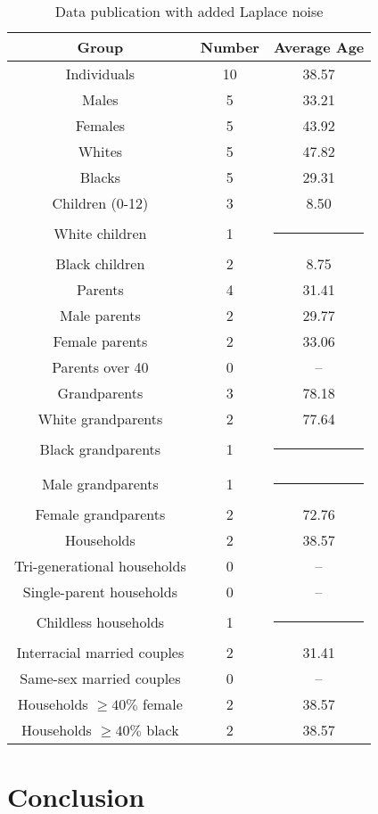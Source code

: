 \documentclass[runningheads]{llncs}
\begin{document}
\begin{table}[t]
\begin{tabular}{c|c|c}
Group & Number & Average Age \\
\hline
Individuals & 10 & 38.57 \\
Males & 5 & 33.21 \\
Females & 5 & 43.92 \\
Whites & 5 & 47.82 \\
Blacks & 5 & 29.31 \\
\hline
Children (0-12) & 3 & 8.50 \\
White children & 1 & \multicolumn{1}{c}{\rule{6mm}{3mm}} \\
Black children & 2 & 8.75 \\
\hline
Parents & 4 & 31.41 \\
Male parents & 2 & 29.77 \\
Female parents & 2 & 33.06 \\
Parents over 40 & 0 & -- \\
\hline
Grandparents & 3 & 78.18 \\
White grandparents & 2 & 77.64 \\
Black grandparents & 1 & \multicolumn{1}{c}{\rule{6mm}{3mm}} \\
Male grandparents & 1 & \multicolumn{1}{c}{\rule{6mm}{3mm}} \\
Female grandparents & 2 & 72.76 \\
\hline
Households & 2 & 38.57 \\
Tri-generational households & 0 & -- \\
Single-parent households & 0 & -- \\
Childless households & 1 & \multicolumn{1}{c}{\rule{6mm}{3mm}} \\
Interracial married couples & 2 & 31.41 \\
Same-sex married couples & 0 & -- \\
Households $\geq 40\% $ female & 2 & 38.57 \\
Households $\geq 40\% $ black & 2 & 38.57 \\

\hline
\end{tabular}
\caption{Data publication with added Laplace noise}\label{publishedstatsnoise}
\end{table}

\section{Conclusion}
\end{document}
